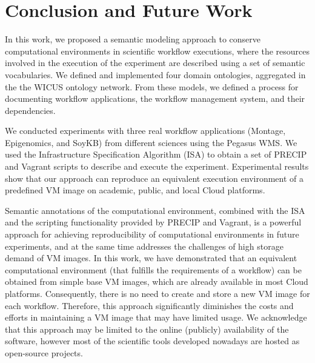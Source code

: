 \section{Conclusion and Future Work}
\label{sec:conclusion}

In this work, we proposed a semantic modeling approach to conserve 
computational environments in scientific workflow executions, where  
the resources involved in the execution of the experiment are described 
using a set of semantic vocabularies. We defined and implemented four 
domain ontologies, aggregated in the the WICUS ontology network. From 
these models, we defined a process for documenting workflow applications, 
the workflow management system, and their dependencies.

We conducted experiments with three real workflow applications (Montage, 
Epigenomics, and SoyKB) from different sciences using the Pegasus WMS. 
We used the Infrastructure Specification Algorithm (ISA) to obtain a set of 
PRECIP and Vagrant scripts to describe and execute the experiment. 
Experimental results show that our approach can reproduce an equivalent 
execution environment of a predefined VM image on academic, public, and 
local Cloud platforms.

Semantic annotations of the computational environment, combined with the 
ISA and the scripting functionality provided by PRECIP and Vagrant, is a 
powerful approach for achieving reproducibility of computational environments 
in future experiments, and at the same time addresses the challenges of high 
storage demand of VM images. In this work, we have demonstrated that
an equivalent computational environment (that fulfills the requirements of a
workflow) can be obtained from simple base VM images, which are already 
available in most Cloud platforms. Consequently, there is no need to create 
and store a new VM image for each workflow. Therefore, this approach 
significantly diminishes the costs and efforts in maintaining a VM image that 
may have limited usage. We acknowledge that this approach may be limited 
to the online (publicly) availability of the software, however most of the scientific
tools developed nowadays are hosted as open-source projects.


